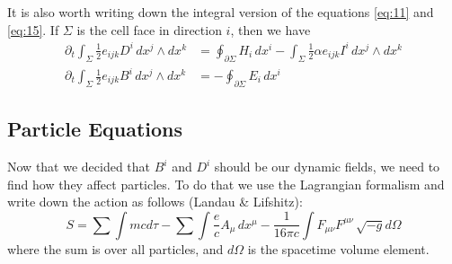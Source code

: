 It is also worth writing down the integral version of the equations
\eqref{eq:11} and \eqref{eq:15}. If $\Sigma$ is the cell face in direction $i$,
then we have
\begin{align}
  \label{eq:22}
  \partial_t\int_{\Sigma}\frac{1}{2}e_{ijk}D^i\,dx^j\wedge dx^k &= \oint_{\partial \Sigma}H_i\,dx^i - \int_{\Sigma}\frac{1}{2}\alpha e_{ijk}I^i\,dx^j\wedge dx^k \\
  \partial_t\int_{\Sigma}\frac{1}{2}e_{ijk}B^i\,dx^j\wedge dx^k &= -\oint_{\partial \Sigma}E_i\,dx^i
\end{align}

\subsection{Particle Equations}
\label{sec:particles}

Now that we decided that $B^i$ and $D^i$ should be our dynamic fields, we need
to find how they affect particles. To do that we use the Lagrangian formalism
and write down the action as follows (Landau \& Lifshitz):
\begin{equation}
  \label{eq:23}
  S = \sum\int mc d\tau - \sum \int \frac{e}{c}A_{\mu}\,dx^{\mu} - \frac{1}{16\pi c}\int F_{\mu\nu}F^{\mu\nu}\,\sqrt{-g}d\Omega
\end{equation}
where the sum is over all particles, and $d\Omega$ is the spacetime volume element.

